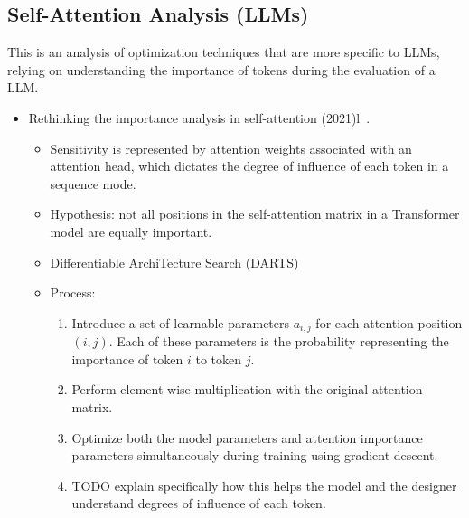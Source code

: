 
\subsection{Self-Attention Analysis (LLMs)}\label{subsec:token-importance-analysis}

This is an analysis of optimization techniques that are more specific to LLMs, relying on understanding the importance of tokens during the evaluation of a LLM\@.

\begin{itemize}
    \item Rethinking the importance analysis in self-attention (2021)l~\cite{shi2021sparsebert}.
    \begin{itemize}
        \item Sensitivity is represented by attention weights associated with an attention head, which dictates the degree of influence of each token in a sequence mode.
        \item Hypothesis: not all positions in the self-attention matrix in a Transformer model are equally important.
        \item Differentiable ArchiTecture Search (DARTS)
        \item Process:
        \begin{enumerate}
            \item Introduce a set of learnable parameters $a_{i,j}$ for each attention position $(i, j)$.
            Each of these parameters is the probability representing the importance of token $i$ to token $j$.
            \item Perform element-wise multiplication with the original attention matrix.
            \item Optimize both the model parameters and attention importance parameters simultaneously during training using gradient descent.
            \item TODO explain specifically how this helps the model and the designer understand degrees of influence of each token.
        \end{enumerate}
    \end{itemize}
\end{itemize}